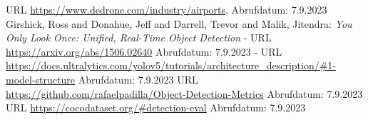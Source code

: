 \documentclass[runningheads]{llncs}
\begin{document}
\begin{thebibliography}{3}

URL \url{https://www.dedrone.com/industry/airports}, Abrufdatum: 7.9.2023
Girshick, Ross and Donahue, Jeff and Darrell, Trevor and Malik, Jitendra: \textit{You Only Look Once: Unified, Real-Time Object Detection} 
 - URL \url{https://arxiv.org/abs/1506.02640}
 Abrufdatum: 7.9.2023
 - URL \url{ https://docs.ultralytics.com/yolov5/tutorials/architecture_description/#1-model-structure}
 Abrufdatum: 7.9.2023
URL \url{https://github.com/rafaelpadilla/Object-Detection-Metrics}
Abrufdatum: 7.9.2023
 URL \url{https://cocodataset.org/\#detection-eval}
 Abrufdatum: 7.9.2023

\end{thebibliography}
\end{document}
